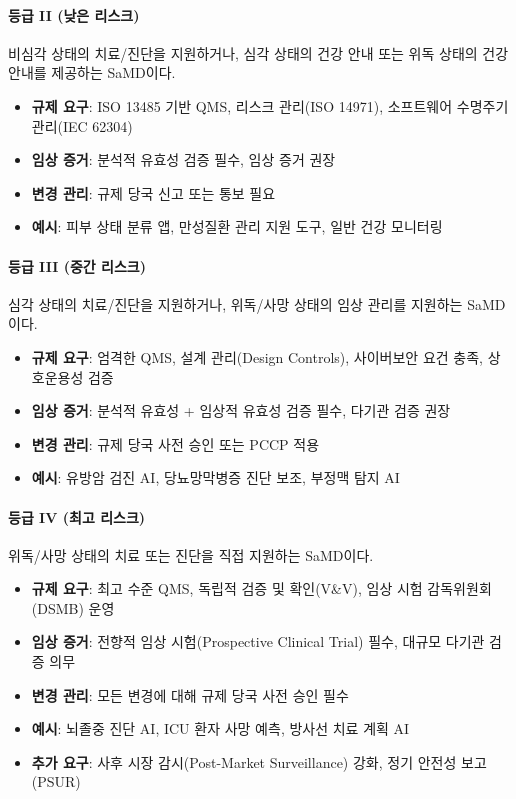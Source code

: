 \paragraph{등급 II (낮은 리스크)}
비심각 상태의 치료/진단을 지원하거나, 심각 상태의 건강 안내 또는 위독 상태의 건강 안내를 제공하는 SaMD이다.

\begin{itemize}
 \item \textbf{규제 요구}: ISO 13485 기반 QMS, 리스크 관리(ISO 14971), 소프트웨어 수명주기 관리(IEC 62304)
 \item \textbf{임상 증거}: 분석적 유효성 검증 필수, 임상 증거 권장
 \item \textbf{변경 관리}: 규제 당국 신고 또는 통보 필요
 \item \textbf{예시}: 피부 상태 분류 앱, 만성질환 관리 지원 도구, 일반 건강 모니터링
\end{itemize}

\paragraph{등급 III (중간 리스크)}
심각 상태의 치료/진단을 지원하거나, 위독/사망 상태의 임상 관리를 지원하는 SaMD이다.

\begin{itemize}
 \item \textbf{규제 요구}: 엄격한 QMS, 설계 관리(Design Controls), 사이버보안\cite{biggio2018wild} 요건 충족, 상호운용성 검증
 \item \textbf{임상 증거}: 분석적 유효성 + 임상적 유효성 검증 필수, 다기관 검증 권장
 \item \textbf{변경 관리}: 규제 당국 사전 승인 또는 PCCP 적용
 \item \textbf{예시}: 유방암\cite{mckinney2020international} 검진 AI, 당뇨\cite{gulshan2016development}망막병증 진단 보조, 부정맥 탐지 AI
\end{itemize}

\paragraph{등급 IV (최고 리스크)}
위독/사망 상태의 치료 또는 진단을 직접 지원하는 SaMD이다.

\begin{itemize}
 \item \textbf{규제 요구}: 최고 수준 QMS, 독립적 검증 및 확인(V\&V), 임상 시험 감독위원회(DSMB) 운영
 \item \textbf{임상 증거}: 전향적 임상 시험(Prospective Clinical Trial) 필수, 대규모 다기관 검증 의무
 \item \textbf{변경 관리}: 모든 변경에 대해 규제 당국 사전 승인 필수
 \item \textbf{예시}: 뇌졸중 진단 AI, ICU 환자 사망 예측, 방사선 치료 계획 AI
 \item \textbf{추가 요구}: 사후 시장 감시(Post-Market Surveillance) 강화, 정기 안전성 보고(PSUR)
\end{itemize}

